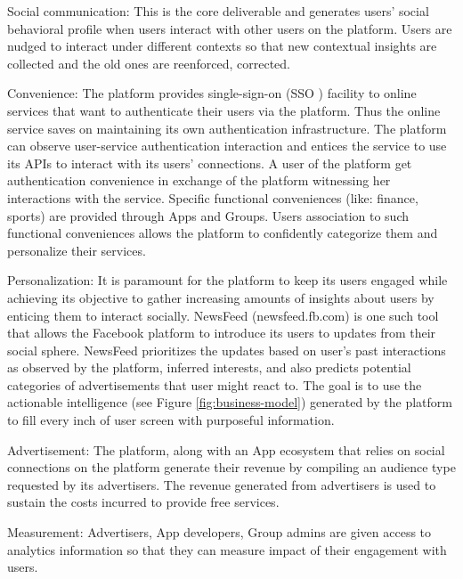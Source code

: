 \documentclass[runningheads]{llncs}
\begin{document}
\begin{description}
\item{Social communication:} This is the core deliverable and
  generates users' social behavioral profile when users interact with
  other users on the platform. Users are nudged to interact under
  different contexts so that new contextual insights are collected and
  the old ones are reenforced, corrected.
\item{Convenience:} The platform provides single-sign-on (SSO
  \cite{sso1,sso2}) facility to online services that want to
  authenticate their users via the platform. Thus the online service
  saves on maintaining its own authentication infrastructure. The
  platform can observe user-service authentication interaction and
  entices the service to use its APIs to interact with its users'
  connections. A user of the platform get authentication convenience
  in exchange of the platform witnessing her interactions with the
  service. Specific functional conveniences (like: finance, sports)
  are provided through Apps and Groups. Users association to such
  functional conveniences allows the platform to confidently
  categorize them and personalize their services.
\item{Personalization:} It is paramount for the platform to keep its
  users engaged while achieving its objective to gather increasing
  amounts of insights about users by enticing them to interact
  socially. NewsFeed (newsfeed.fb.com) is one such tool that
  allows the Facebook platform to introduce its users to updates from
  their social sphere. NewsFeed prioritizes the updates based on
  user's past interactions as observed by the platform, inferred
  interests, and also predicts potential categories of advertisements
  that user might react to. The goal is to use the actionable
  intelligence (see Figure \ref{fig:business-model}) generated by the
  platform to fill every inch of user screen with purposeful
  information.
\item{Advertisement:} The platform, along with an App ecosystem that
  relies on social connections on the platform generate their revenue
  by compiling an audience type requested by its advertisers. The
  revenue generated from advertisers is used to sustain the costs
  incurred to provide free services.
\item{Measurement:} Advertisers, App developers, Group admins are
  given access to analytics information so that they can measure
  impact of their engagement with users.
\end{description}
\end{document}
